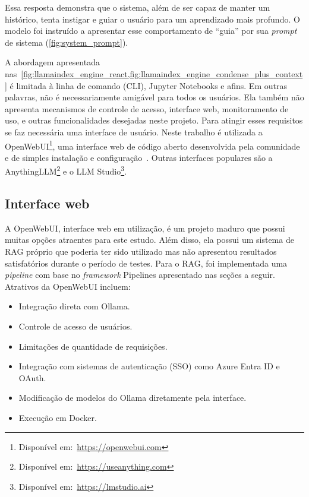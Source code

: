 \documentclass[journal]{IEEEtran}
\begin{document}
Essa resposta demonstra que o sistema, além de ser capaz de manter um histórico, tenta instigar e guiar o usuário para um aprendizado mais profundo.
O modelo foi instruído a apresentar esse comportamento de ``guia'' por sua \textit{prompt} de sistema (\cref{fig:system_prompt}).

A abordagem apresentada nas~\cref{fig:llamaindex_engine_react,fig:llamaindex_engine_condense_plus_context} é limitada à linha de comando (CLI), Jupyter Notebooks e afins.
Em outras palavras, não é necessariamente amigável para todos os usuários.
Ela também não apresenta mecanismos de controle de acesso, interface web, monitoramento de uso, e outras funcionalidades desejadas neste projeto.
Para atingir esses requisitos se faz necessária uma interface de usuário.
Neste trabalho é utilizada a OpenWebUI\footnote{Disponível em:~\url{https://openwebui.com}}, uma interface web de código aberto desenvolvida pela comunidade e de simples instalação e configuração~\cite{openwebui}.
Outras interfaces populares são a AnythingLLM\footnote{Disponível em:~\url{https://useanything.com}} e o LLM Studio\footnote{Disponível em:~\url{https://lmstudio.ai}}.

\subsection{Interface web}

\noindent%
A OpenWebUI, interface web em utilização, é um projeto maduro que possui muitas opções atraentes para este estudo.
Além disso, ela possui um sistema de RAG próprio que poderia ter sido utilizado mas não apresentou resultados satisfatórios durante o período de testes.
Para o RAG, foi implementada uma \textit{pipeline} com base no \textit{framework} Pipelines apresentado nas seções a seguir.
Atrativos da OpenWebUI incluem:

\begin{itemize}
    \item Integração direta com Ollama.
    \item Controle de acesso de usuários.
    \item Limitações de quantidade de requisições.
    \item Integração com sistemas de autenticação (SSO) como Azure Entra ID e OAuth.
    \item Modificação de modelos do Ollama diretamente pela interface.
    \item Execução em Docker.
\end{itemize}
\end{document}

